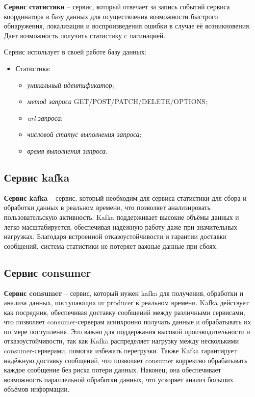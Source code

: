 \textbf{Сервис статистики} -- сервис, который отвечает за запись событий сервиса координатора в базу данных для осуществления возможности быстрого обнаружения, локализации и воспроизведения ошибки в случае её возникновения. Дает возможность получить статистику с пагинацией.

Сервис использует в своей работе базу данных:
\begin{itemize}
  \item Статистика:
  \begin{itemize}
    \item \textit{уникальный идентификатор};
    \item \textit{метод запроса} GET/POST/PATCH/DELETE/OPTIONS;
    \item \textit{url запроса};
    \item \textit{числовой статус выполнения запроса};
    \item \textit{время выполнения запроса}.
  \end{itemize}
\end{itemize}


\subsection{Сервис kafka}

\textbf{Сервис kafka} -- сервис, который необходим для сервиса статистики для сбора и обработки данных в реальном времени, что позволяет анализировать пользовательскую активность. Kafka поддерживает высокие объёмы данных и легко масштабируется, обеспечивая надёжную работу даже при значительных нагрузках. Благодаря встроенной отказоустойчивости и гарантии доставки сообщений, система статистики не потеряет важные данные при сбоях.


\subsection{Сервис consumer}

\textbf{Сервис consumer} -- сервис, который нужен kafka для получения, обработки и анализа данных, поступающих от producer в реальном времени. Kafka действует как посредник, обеспечивая доставку сообщений между различными сервисами, что позволяет consumer-серверам асинхронно получать данные и обрабатывать их по мере поступления. Это важно для поддержания высокой производительности и отказоустойчивости, так как Kafka распределяет нагрузку между несколькими consumer-серверами, помогая избежать перегрузки. Также Kafka гарантирует надёжную доставку сообщений, что позволяет consumer корректно обрабатывать каждое сообщение без риска потери данных. Наконец, она обеспечивает возможность параллельной обработки данных, что ускоряет анализ больших объёмов информации.


